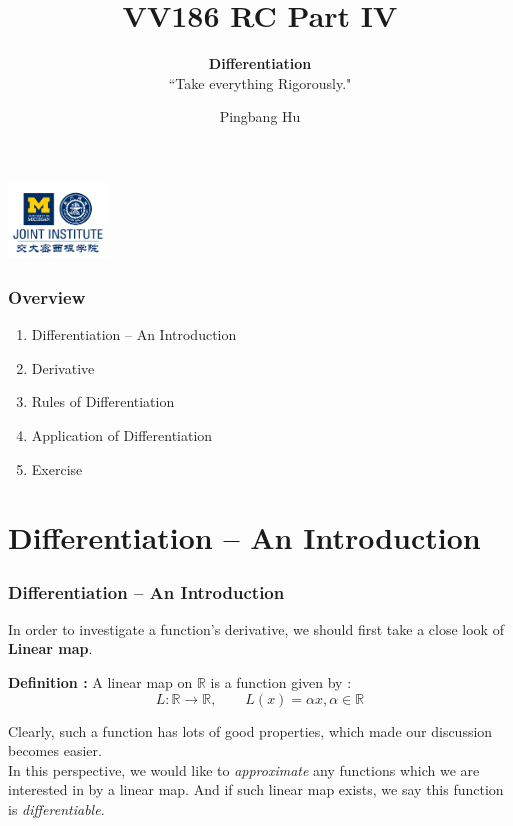 \documentclass[12pt, t]{beamer}
\title{VV186 RC Part IV}
\subtitle{\textbf{Differentiation}\\``Take everything Rigorously."}
\institute[UM-SJTU JI]{University of Michigan-Shanghai Jiao Tong University Joint Institute}
\author{Pingbang Hu}
\renewcommand{\emph}[1]{{\color{Turquoise3}\textsl{#1}}}
\begin{document}
\begin{frame}
    \titlepage
    \begin{center}
        \includegraphics[height=2cm]{Figures/logo/logo2.png}
    \end{center}
\end{frame}

\begin{frame}
    \frametitle{Overview}
    \begin{enumerate}
        \item Differentiation -- An Introduction
        \item Derivative
        \item Rules of Differentiation
        \item Application of Differentiation
        \item Exercise
    \end{enumerate}
\end{frame}

\section{Differentiation -- An Introduction}
\begin{frame}
    \frametitle{Differentiation -- An Introduction}

    In order to investigate a function's derivative, we should first take a close look of \textbf{Linear map}.

    \vspace{2em}
    \textbf{Definition : } A linear map on $\mathbb{R}$ is a function given by :
    \begin{equation*}
        L: \mathbb{R}\rightarrow\mathbb{R}, \qquad L(x)=\alpha x, \alpha \in \mathbb{R}
    \end{equation*}

    \vspace{1em}
    Clearly, such a function has lots of good properties, which made our discussion becomes easier.\\
    \vspace{1em}
    In this perspective, we would like to \emph{approximate} any functions which we are interested in by a linear map. And if
    such linear map exists, we say this function is \emph{differentiable}.
\end{frame}
\end{document}
